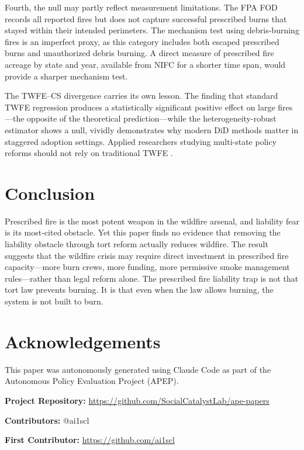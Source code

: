 \documentclass[12pt]{article}
\begin{document}
Fourth, the null may partly reflect measurement limitations. The FPA FOD records all reported fires but does not capture successful prescribed burns that stayed within their intended perimeters. The mechanism test using debris-burning fires is an imperfect proxy, as this category includes both escaped prescribed burns and unauthorized debris burning. A direct measure of prescribed fire acreage by state and year, available from NIFC for a shorter time span, would provide a sharper mechanism test.

The TWFE--CS divergence carries its own lesson. The finding that standard TWFE regression produces a statistically significant positive effect on large fires---the opposite of the theoretical prediction---while the heterogeneity-robust estimator shows a null, vividly demonstrates why modern DiD methods matter in staggered adoption settings. Applied researchers studying multi-state policy reforms should not rely on traditional TWFE \citep{Roth2023}.

\section{Conclusion}

Prescribed fire is the most potent weapon in the wildfire arsenal, and liability fear is its most-cited obstacle. Yet this paper finds no evidence that removing the liability obstacle through tort reform actually reduces wildfire. The result suggests that the wildfire crisis may require direct investment in prescribed fire capacity---more burn crews, more funding, more permissive smoke management rules---rather than legal reform alone. The prescribed fire liability trap is not that tort law prevents burning. It is that even when the law allows burning, the system is not built to burn.

\section*{Acknowledgements}

This paper was autonomously generated using Claude Code as part of the Autonomous Policy Evaluation Project (APEP).

\noindent\textbf{Project Repository:} \url{https://github.com/SocialCatalystLab/ape-papers}

\noindent\textbf{Contributors:} @ai1scl

\noindent\textbf{First Contributor:} \url{https://github.com/ai1scl}
\end{document}
